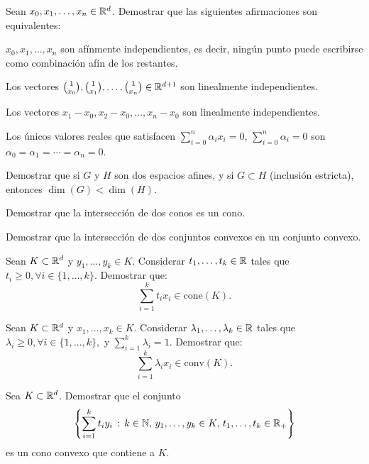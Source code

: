 \documentclass[a4paper,12pt]{article}
\renewcommand{\conv}[1]{\mathrm{conv}(#1)}
\renewcommand{\cone}[1]{\mathrm{cone}(#1)}
\begin{document}

\begin{exerciselist}

  \item Sean $x_0, x_1, \ldots, x_n \in \mathbb{R}^d$. Demostrar que las siguientes afirmaciones son equivalentes:

  \begin{exerciselist}
  \item $x_0, x_1, \ldots, x_n$ son afínmente independientes, es decir, ningún punto puede escribirse como
  combinación afín de los restantes.
  \item Los vectores $\binom{1}{x_0}, \binom{1}{x_1}, \ldots, \binom{1}{x_n} \in \mathbb{R}^{d+1}$ son
  linealmente independientes.
  \item Los vectores $x_1-x_0, x_2 - x_0, \ldots, x_n-x_0$ son linealmente independientes.
  \item Los únicos valores reales que satisfacen $\sum_{i=0}^n \alpha_i x_i = 0$, $\sum_{i=0}^n \alpha_i= 0$
  son $\alpha_0 = \alpha_1 = \cdots = \alpha_n =0$.
  \end{exerciselist}

  \item Demostrar que si $G$ y $H$ son dos espacios afines, y si $G \subset H$ (inclusión estricta), entonces $\dim(G) < \dim(H)$.

  \item Demostrar que la intersección de dos conos es un cono.

  \item Demostrar que la intersección de dos conjuntos convexos en un conjunto convexo.

  \item Sean $K \subset \mathbb{R}^d$  y $y_1, \ldots, y_k \in K$. Considerar $t_1, \ldots, t_k \in \mathbb{R}$  tales que $t_i \geq 0, \forall i \in \{1, \ldots, k\}$. Demostrar que:
  $$
  \sum_{i=1}^k t_i x_i \in \cone{K}.
  $$

  \item Sean $K \subset \mathbb{R}^d$  y $x_1, \ldots, x_k \in K$. Considerar $\lambda_1, \ldots, \lambda_k \in \mathbb{R}$  tales que $\lambda_i \geq 0, \forall i \in \{1, \ldots, k\},$ y $\sum_{i=1}^k \lambda_i = 1$. Demostrar que:
  $$
  \sum_{i=1}^k \lambda_i x_i \in \conv{K}.
  $$

  \item Sea $K \subset \mathbb{R}^d$. Demostrar que el conjunto
  $$
  \left\{ \sum_{i=1}^k t_i y_i \, : \, k \in \mathbb{N}, \, y_1, \ldots, y_k \in K, \, t_1, \ldots, t_k \in \mathbb{R}_+ \right\}
  $$
  es un cono convexo que contiene a $K$.


\end{exerciselist}
\end{document}
